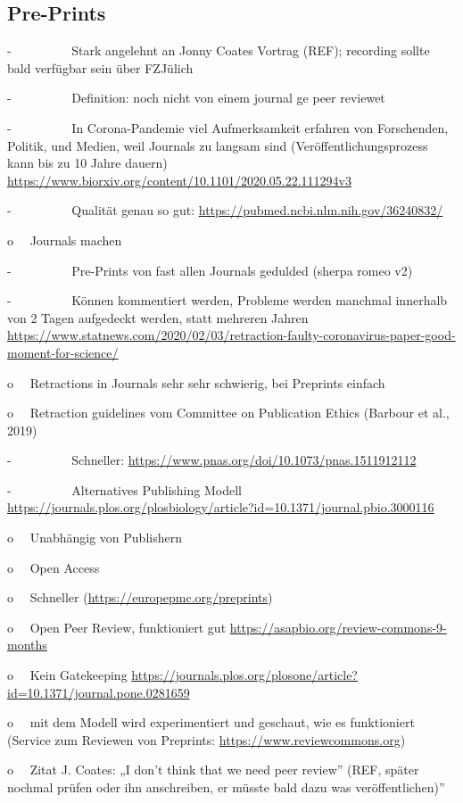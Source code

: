 \documentclass[
  letterpaper,
  DIV=11,
  numbers=noendperiod]{scrreprt}
\begin{document}
\subsection{Pre-Prints}\label{pre-prints}

-~~~~~~~~~ Stark angelehnt an Jonny Coates Vortrag (REF); recording
sollte bald verfügbar sein über FZJülich

-~~~~~~~~~ Definition: noch nicht von einem journal ge peer reviewet

-~~~~~~~~~ In Corona-Pandemie viel Aufmerksamkeit erfahren von
Forschenden, Politik, und Medien, weil Journals zu langsam sind
(Veröffentlichungsprozess kann bis zu 10 Jahre dauern)
\url{https://www.biorxiv.org/content/10.1101/2020.05.22.111294v3}

-~~~~~~~~~ Qualität genau so gut:
\url{https://pubmed.ncbi.nlm.nih.gov/36240832/}

o~~ Journals machen

-~~~~~~~~~ Pre-Prints von fast allen Journals gedulded (sherpa romeo v2)

-~~~~~~~~~ Können kommentiert werden, Probleme werden manchmal innerhalb
von 2 Tagen aufgedeckt werden, statt mehreren Jahren
\url{https://www.statnews.com/2020/02/03/retraction-faulty-coronavirus-paper-good-moment-for-science/}

o~~ Retractions in Journals sehr sehr schwierig, bei Preprints einfach

o~~ Retraction guidelines vom Committee on Publication Ethics (Barbour
et al., 2019)

-~~~~~~~~~ Schneller:
\url{https://www.pnas.org/doi/10.1073/pnas.1511912112}

-~~~~~~~~~ Alternatives Publishing Modell
\url{https://journals.plos.org/plosbiology/article?id=10.1371/journal.pbio.3000116}

o~~ Unabhängig von Publishern

o~~ Open Access

o~~ Schneller (\url{https://europepmc.org/preprints})

o~~ Open Peer Review, funktioniert gut
\url{https://asapbio.org/review-commons-9-months}

o~~ Kein Gatekeeping
\url{https://journals.plos.org/plosone/article?id=10.1371/journal.pone.0281659}

o~~ mit dem Modell wird experimentiert und geschaut, wie es funktioniert
(Service zum Reviewen von Preprints:
\url{https://www.reviewcommons.org})

o~~ Zitat J. Coates: „I don't think that we need peer review'' (REF,
später nochmal prüfen oder ihn anschreiben, er müsste bald dazu was
veröffentlichen)''
\end{document}
